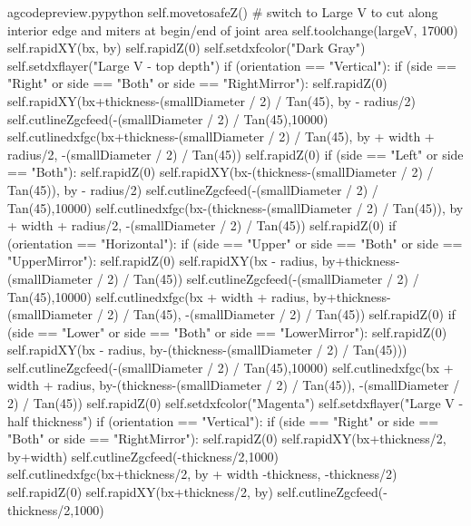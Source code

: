 \documentclass{ltxdoc}
\begin{document}
\begin{writecode}{a}{gcodepreview.py}{python}
        self.movetosafeZ()
    # switch to Large V to cut along interior edge and miters at begin/end of joint area
        self.toolchange(largeV, 17000)
        self.rapidXY(bx, by)
        self.rapidZ(0)
        self.setdxfcolor("Dark Gray")
        self.setdxflayer("Large V - top depth")
        if (orientation == "Vertical"):
            if (side == "Right" or side == "Both" or side == "RightMirror"):
                self.rapidZ(0)
                self.rapidXY(bx+thickness-(smallDiameter / 2) / Tan(45), by - radius/2)
                self.cutlineZgcfeed(-(smallDiameter / 2) / Tan(45),10000)
                self.cutlinedxfgc(bx+thickness-(smallDiameter / 2) / Tan(45), by + width + radius/2, -(smallDiameter / 2) / Tan(45))
                self.rapidZ(0)
            if (side == "Left" or side == "Both"):
                self.rapidZ(0)
                self.rapidXY(bx-(thickness-(smallDiameter / 2) / Tan(45)), by - radius/2)
                self.cutlineZgcfeed(-(smallDiameter / 2) / Tan(45),10000)
                self.cutlinedxfgc(bx-(thickness-(smallDiameter / 2) / Tan(45)), by + width + radius/2, -(smallDiameter / 2) / Tan(45))
                self.rapidZ(0)
        if (orientation == "Horizontal"):
            if (side == "Upper" or side == "Both" or side == "UpperMirror"):
                self.rapidZ(0)
                self.rapidXY(bx - radius, by+thickness-(smallDiameter / 2) / Tan(45))
                self.cutlineZgcfeed(-(smallDiameter / 2) / Tan(45),10000)
                self.cutlinedxfgc(bx + width + radius, by+thickness-(smallDiameter / 2) / Tan(45), -(smallDiameter / 2) / Tan(45))
                self.rapidZ(0)
            if (side == "Lower" or side == "Both" or side == "LowerMirror"):
                self.rapidZ(0)
                self.rapidXY(bx - radius, by-(thickness-(smallDiameter / 2) / Tan(45)))
                self.cutlineZgcfeed(-(smallDiameter / 2) / Tan(45),10000)
                self.cutlinedxfgc(bx + width + radius, by-(thickness-(smallDiameter / 2) / Tan(45)), -(smallDiameter / 2) / Tan(45))
                self.rapidZ(0)
        self.setdxfcolor("Magenta")
        self.setdxflayer("Large V - half thickness")
        if (orientation == "Vertical"):
            if (side == "Right" or side == "Both" or side == "RightMirror"):
                self.rapidZ(0)
                self.rapidXY(bx+thickness/2, by+width)
                self.cutlineZgcfeed(-thickness/2,1000)
                self.cutlinedxfgc(bx+thickness/2, by + width -thickness, -thickness/2)
                self.rapidZ(0)
                self.rapidXY(bx+thickness/2, by)
                self.cutlineZgcfeed(-thickness/2,1000)

\end{writecode}
\end{document}
